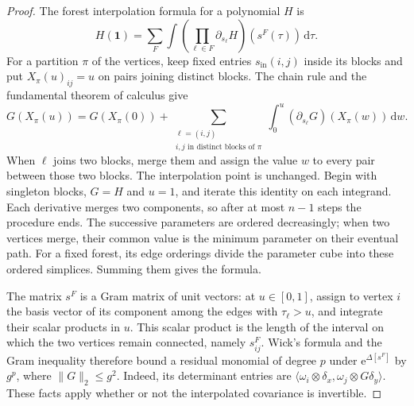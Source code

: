 \documentclass[11pt,letterpaper,reqno]{amsart}
\newcommand{\dd}{\mathrm d}
\begin{document}
\begin{proof}
The forest interpolation formula for a polynomial $H$ is
\[
 H(\mathbf1)=\sum_F\int
       \left(\prod_{\ell\in F}\partial_{s_\ell}H\right)
                                 (s^F(\tau))\,\dd\tau.
\]
For a partition $\pi$ of the vertices, keep fixed
entries $s_{\mathrm{in}}(i,j)$ inside its blocks and
put $X_\pi(u)_{ij}=u$ on pairs joining distinct blocks.
The chain rule and the fundamental theorem of calculus give
\begin{equation}\label{eq:interacting-forest-first-step}
 G(X_\pi(u))=G(X_\pi(0))
       +\sum_{\substack{\ell=(i,j)\\
                        i,j\text{ in distinct blocks of }\pi}}
          \int_0^u(\partial_{s_\ell}G)(X_\pi(w))\,\dd w .
\end{equation}
When $\ell$ joins two blocks, merge them and assign
the value $w$ to every pair between those two blocks.
The interpolation point is unchanged. Begin with singleton
blocks, $G=H$ and $u=1$, and iterate this identity
on each integrand. Each derivative
merges two components, so after at most $n-1$
steps the procedure ends. The successive
parameters are ordered decreasingly; when two
vertices merge, their common value is the
minimum parameter on their eventual path.
For a fixed forest, its edge orderings divide
the parameter cube into these ordered simplices.
Summing them gives the formula.

The matrix $s^F$ is a Gram matrix of unit
vectors: at $u\in[0,1]$, assign to vertex $i$
the basis vector of its component among the
edges with $\tau_\ell>u$, and integrate their
scalar products in $u$. This scalar product
is the length of the interval on which the
two vertices remain connected, namely
$s_{ij}^F$. Wick's formula and the Gram
inequality therefore bound a residual monomial
of degree $p$ under $\mathrm e^{\Delta[s^F]}$
by $g^p$, where $\|G\|_2\le g^2$.
Indeed, its determinant entries are
$\langle\omega_i\otimes\delta_x,\omega_j\otimes G\delta_y\rangle$.
These facts apply whether or not the
interpolated covariance is invertible.


\end{proof}
\end{document}
